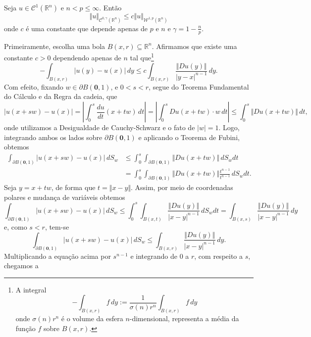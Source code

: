\documentclass[a4paper, 11pt]{book}
\theoremstyle{definition}
\newcommand{\bR}{\mathbb{R}}
\newcommand{\bz}{\mathbf{0}}
\newcommand{\cC}{\mathcal{C}}
\newcommand{\cW}{\mathcal{W}}
\newcommand{\sint}{-\!\!\!\!\!\!\int}
\begin{document}
\begin{tbox} \label{thm:holdersobolev1}
    Seja $u \in \cC^1(\bR^n)$ e $n < p \leqslant \infty$. Então
    \[
        \Vert u \Vert_{\cC^{0,\gamma}(\bR^n)} \leqslant c \Vert u \Vert_{\cW^{1,p}(\bR^n)}
    \]
    onde $c$ é uma constante que depende apenas de $p$ e $n$ e $\gamma = 1 - \frac{n}{p}$.
\end{tbox}
\begin{prf}
    Primeiramente, escolha uma bola $B(x,r) \subseteq \bR^n$.
    Afirmamos que existe uma constante $c > 0$ dependendo apenas de $n$ tal que\footnote{A integral
    \[
        \sint_{B(x,r)} f\,dy := \frac{1}{\sigma(n)r^n}\int_{B(x,r)} f \,dy
    \]
    onde $\sigma(n)r^n$ é o volume da esfera $n$-dimensional, representa a média da função $f$ sobre $B(x,r)$.}
    \begin{equation} \label{eq:desigualdade-uyux}
        \sint_{B(x,r)} |u(y) - u(x)| \,dy \leqslant c \int_{B(x,r)} \frac{\Vert Du(y) \Vert}{|y-x|^{n-1}} \,dy.
    \end{equation}
    Com efeito, fixando $w \in \partial B(\bz,1)$, e $0 < s < r$, segue do Teorema Fundamental do Cálculo e da Regra da cadeia, que
    \[
        |u(x + sw) - u(x)| = \left| \int_0^s \frac{du}{dt} (x + tw) \,dt \right| = \left|\int_0^s Du(x + tw) \cdot w \,dt \right| \leqslant \int_0^s \Vert Du(x + tw) \Vert \,dt,
    \]
    onde utilizamos a Desigualdade de Cauchy-Schwarz e o fato de $|w| = 1$. Logo, integrando ambos os lados sobre $\partial B(\bz,1)$ e aplicando o Teorema de Fubini, obtemos
    \[
        \begin{aligned}
            \int_{\partial B(\bz,1)} |u(x + sw) - u(x)|\,dS_w &\leqslant  \int_0^s \int_{\partial B(\bz,1)} \Vert Du(x + tw) \Vert \,dS_wdt\\ 
            &= \int_0^s \int_{\partial B(\bz,1)} \Vert Du(x + tw) \Vert \frac{t^{n-1}}{t^{n-1}} \,dS_wdt.
        \end{aligned}
    \]
    Seja $y = x + tw$, de forma que $t = \Vert x - y \Vert$. Assim, por meio de coordenadas polares e mudança de variáveis obtemos
    \[
        \int_{\partial B(\bz,1)} |u(x + sw) - u(x)|\,dS_w \leqslant \int_0^s \int_{B(x,t)} \frac{\Vert Du(y) \Vert}{|x-y|^{n-1}} \,dS_wdt =  \int_{B(x,s)} \frac{\Vert Du(y) \Vert}{|x-y|^{n-1}} \,dy
    \]
    e, como $s < r$, tem-se
    \[
        \int_{\partial B(\bz,1)} |u(x + sw) - u(x)|\,dS_w \leqslant   \int_{B(x,r)} \frac{\Vert Du(y) \Vert}{|x-y|^{n-1}} \,dy.
    \]
    Multiplicando a equação acima por $s^{n-1}$ e integrando de $0$ a $r$, com respeito a $s$, chegamos a

\end{prf}
\end{document}
